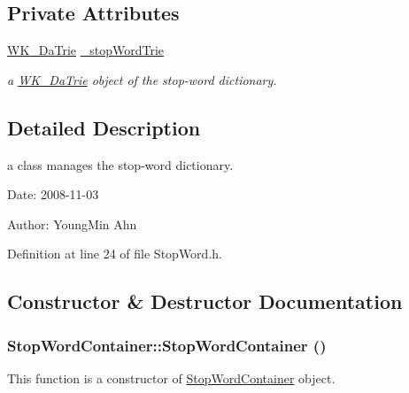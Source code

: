 \subsection*{Private Attributes}
\begin{CompactItemize}
\item 
\hyperlink{classkmaOrange_1_1WK__DaTrie}{WK\_\-DaTrie} \hyperlink{classkmaOrange_1_1StopWordContainer_dcc2e81494476e1718dacb36fbe075dc}{\_\-stopWordTrie}
\begin{CompactList}\small\item\em a \hyperlink{classkmaOrange_1_1WK__DaTrie}{WK\_\-DaTrie} object of the stop-word dictionary. \item\end{CompactList}\end{CompactItemize}


\subsection{Detailed Description}
a class manages the stop-word dictionary. 

\begin{Desc}
\item[Date:]2008-11-03 \end{Desc}
\begin{Desc}
\item[Author:]YoungMin Ahn \end{Desc}


Definition at line 24 of file StopWord.h.

\subsection{Constructor \& Destructor Documentation}
\hypertarget{classkmaOrange_1_1StopWordContainer_7356fb7080dee806d788624b8a247dba}{
\subsubsection[{StopWordContainer}]{\setlength{\rightskip}{0pt plus 5cm}StopWordContainer::StopWordContainer ()}}
\label{classkmaOrange_1_1StopWordContainer_7356fb7080dee806d788624b8a247dba}


This function is a constructor of \hyperlink{classkmaOrange_1_1StopWordContainer}{StopWordContainer} object. 

